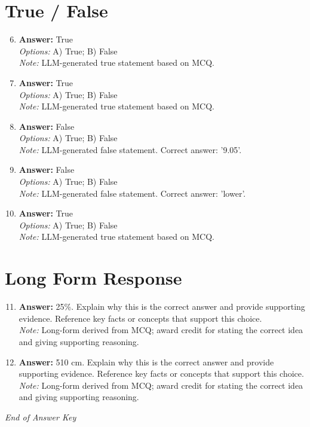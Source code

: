 \documentclass[12pt]{article}
\begin{document}
\section*{True / False}
\begin{enumerate}[label=\arabic*.]
\setcounter{enumi}{5}
\item \textbf{Answer:} True
\\ \textit{Options:} A) True; B) False
\\ \textit{Note:} LLM-generated true statement based on MCQ.
\item \textbf{Answer:} True
\\ \textit{Options:} A) True; B) False
\\ \textit{Note:} LLM-generated true statement based on MCQ.
\item \textbf{Answer:} False
\\ \textit{Options:} A) True; B) False
\\ \textit{Note:} LLM-generated false statement. Correct answer: '9.05'.
\item \textbf{Answer:} False
\\ \textit{Options:} A) True; B) False
\\ \textit{Note:} LLM-generated false statement. Correct answer: 'lower'.
\item \textbf{Answer:} True
\\ \textit{Options:} A) True; B) False
\\ \textit{Note:} LLM-generated true statement based on MCQ.
\end{enumerate}

\section*{Long Form Response}
\begin{enumerate}[label=\arabic*.]
\setcounter{enumi}{10}
\item \textbf{Answer:} 25\%. Explain why this is the correct answer and provide supporting evidence. Reference key facts or concepts that support this choice.
\\ \textit{Note:} Long-form derived from MCQ; award credit for stating the correct idea and giving supporting reasoning.
\item \textbf{Answer:} 510 cm. Explain why this is the correct answer and provide supporting evidence. Reference key facts or concepts that support this choice.
\\ \textit{Note:} Long-form derived from MCQ; award credit for stating the correct idea and giving supporting reasoning.
\end{enumerate}

\vfill
\noindent\textit{End of Answer Key}
\end{document}
